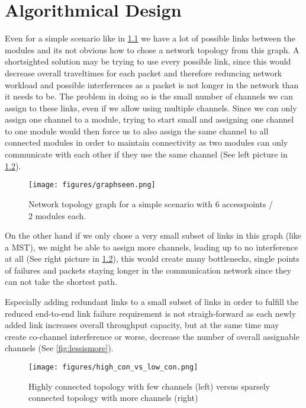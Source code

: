 \chapter{Algorithmical Design}
  Even for a simple scenario like in \ref{fig:graphseen} we have a lot of possible links between the modules and its not obvious how to
  chose a network topology from this graph.
  A shortsighted solution may be trying to use every possible link, since this would decrease overall traveltimes for each packet and therefore
  reduncing network workload and possible interferences as a packet is not longer in the network than it needs to be. 
  The problem in doing so is the small number of channels we can assign to these links, even if we allow using multiple channels.
  Since we can only assign one channel to a module, trying to start small and assigning one channel to one module would then force us to also 
  assign the same channel to all connected modules in order to maintain connectivity as two modules can only communicate with each other if they use the same channel
  (See left picture in \ref{fig:high_con_vs_low_con}). 
  
  \begin{figure}[h!]
    \centering
    \texttt{[image: figures/graphseen.png]}
    \caption{Network topology graph for a simple scenario with 6 accesspoints / 2 modules each.}
    \label{fig:graphseen}
  \end{figure}

  On the other hand if we only chose a very small subset of links in this graph (like a MST), we might be able to 
  assign more channels, leading up to no interference at all (See right picture in \ref{fig:high_con_vs_low_con}),
  this would create many bottlenecks, single points of failures and packets staying longer in the communication network since they can not take the shortest path.

  Especially adding redundant links to a small subset of links in order to fulfill the reduced end-to-end link failure requirement is not straigh-forward as each newly
  added link increases overall throughput capacity, but at the same time may create co-channel interference or worse, decrease the number of overall assignable channels
  (See \ref{fig:lessismore}).
 
  \begin{figure}[h!]
    \centering
    \texttt{[image: figures/high\_con\_vs\_low\_con.png]}
    \caption{Highly connected topology with few channels (left) versus sparsely connected topology with more channels (right)}
    \label{fig:high_con_vs_low_con}
  \end{figure}
  
